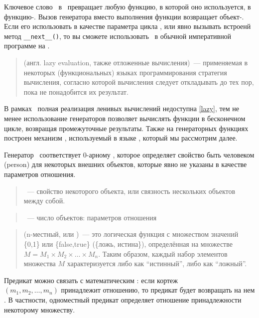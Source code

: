 \label{yield}

Ключевое слово \ в \py\ превращает любую функцию, в которой оно
используется, в функцию-. Вызов генератора вместо
выполнения функции возвращает объект-. Если его использовать в
качестве параметра цикла , или явно вызывать встроенй метод
\verb|__next__()|, то вы сможете использовать \ в
обычной императивной программе на \py.

\begin{quotation}\noindent
{} (англ. lazy evaluation, также отложенные вычисления)\
--- применяемая в некоторых (функциональных) языках программирования стратегия
вычисления, согласно которой вычисления следует откладывать до тех пор, пока не
понадобится их результат.
\end{quotation}

В рамках \py\ полная реализация ленивых вычислений недоступна \ref{lazy}, тем не
менее использование генераторов позволяет вычислять функции в бесконечном цикле,
возвращая промежуточные результаты. Также на генераторных функциях построен
механизм \term{логического вывода в возвратами}, используемый в языке \prolog,
который мы рассмотрим далее.

\medskip
{}

Генератор \ соответствует 0-арному 
\file{person()}, которое определяет свойство быть человеком (person) для
некоторых внешних объектов, которые явно не указаны в качестве параметров
отношения.

\begin{quotation}\noindent
{}\ --- свойство некоторого объекта, или связность нескольких
объектов между собой.
\end{quotation}

\begin{quotation}\noindent
{}\ --- число объектов: параметров отношения
\end{quotation}

\begin{quotation}\noindent
{} (n-местный, или )\ --- это логическая функция
с множеством значений \{0,1\} или \{false,true\} (\{ложь, истина\}),
определённая на множестве $M=M_1 \times M_2 \times \ldots \times M_n$. Таким
образом, каждый набор элементов множества $M$ характеризуется либо как
``истинный'', либо как ``ложный''.
\end{quotation}
Предикат можно связать с математическим : если кортеж\\
$(m_1,m_2,\dots ,m_n)$ принадлежит отношению, то предикат будет возвращать на
нем \file{true}. В частности, одноместный предикат определяет отношение
принадлежности некоторому множеству.

